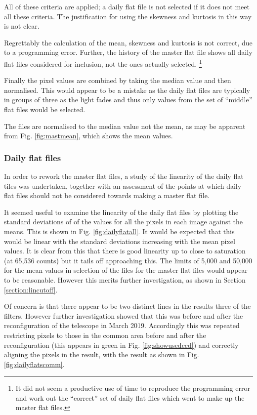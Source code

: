 All of these criteria are applied; a daily flat file is not selected if it does
not meet all these criteria. The justification for using the skewness and
kurtosis in this way is not clear.

Regrettably the calculation of the mean, skewness and kurtosis is not correct,
due to a programming error. Further, the history of the master flat file shows
all daily flat files considered for inclusion, not the ones actually selected.
\footnote{It did not seem a productive use of time to reproduce the programming error
and work out the ``correct'' set of daily flat files which went to make up the
master flat files.}

Finally the pixel values are combined by taking the median value and then
normalised. This would appear to be a mistake as the daily flat files are
typically in groups of three as the light fades and thus only values from the
set of ``middle'' flat files would be selected.

The files are normalised to the median value not the mean, as may be apparent
from Fig. \ref{fig:mastmean}, which shows the mean values.

\subsubsection{Daily flat files}
\protect\label{section:dailyflats}

In order to rework the master flat files, a study of the linearity of the daily
flat tiles was undertaken, together with an assessment of the points at which
daily flat files should not be considered towards making a master flat file.

\protect\label{section:linearity}
It seemed useful to examine the linearity of the daily flat files by plotting
the standard deviations of of the values for all the pixels in each image against the means.
This is shown in Fig. \ref{fig:dailyflatall}. It would be  expected that this
would be linear with the standard deviations increasing with the mean pixel
values. It is clear from this that there is good linearity up to close to
saturation (at 65,536 counts) but it tails off approaching this. The limits of
5,000 and 50,000 for the mean values in selection of the files for the master
flat files would appear to be  reasonable. However this merits further
investigation, as shown in Section  \ref{section:lincutoff}.

Of concern is that there appear to be two distinct lines in the results three of
the filters. However further investigation showed that this was before and after
the reconfiguration of the telescope in March 2019. Accordingly this was
repeated restricting pixels to those in the common area before and after the
reconfiguration (this appears in green in Fig. \ref{fig:showusedccd}) and correctly
aligning the pixels in the result, with the result as shown in Fig. \ref{fig:dailyflatscomm}.

